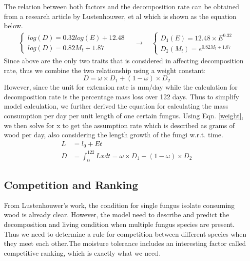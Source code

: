 \documentclass[a4paper,12pt]{article}
\begin{document}
The relation between both factors and the decomposition rate can be obtained from a research article by Lustenhouwer, et al\cite{CompArticle} which is shown as the equation below.
\begin{align*}
\left\{ \begin{array}{c}
log(D)=0.32 log(E)+12.48 \\
log(D)=0.82M_t+1.87
\end{array} \right.  \quad \rightarrow \quad  \left\{ 
\begin{array}{c}
D_1(E)= 12.48 \times E^{0.32}\\
D_2(M_t)= e^{0.82M_t+1.87}
\end{array} \right.
\end{align*} 
Since above are the only two traits that is considered in affecting decomposition rate, thus we combine the two relationship using a weight constant:
\begin{equation}\label{weight}
D=\omega \times D_1 + (1-\omega) \times D_2
\end{equation}
However, since the unit for extension rate is mm/day while the calculation for decomposition rate is the percentage mass loss over 122 days. Thus to simplify model calculation, we further derived the equation for calculating the mass consumption per day per unit length of one certain fungus. Using Eqn. \ref{weight}, we then solve for x to get the assumption rate which is described as grams of wood per day, also considering the length growth of the fungi w.r.t. time.
\begin{align*}
L&=l_0 + Et \\
D&=\int_0^{122} Lx dt=\omega \times D_1 + (1-\omega) \times D_2
\end{align*}


\subsection{Competition and Ranking}
From Lustenhouwer's work, the condition for single fungus isolate consuming wood is already clear. However, the model need to describe and predict the decomposition and living condition when multiple fungus species are present. Thus we need to determine a rule for competition between different species when they meet each other.The  moisture tolerance includes an interesting factor called competitive ranking, which is exactly what we need.
\end{document}
